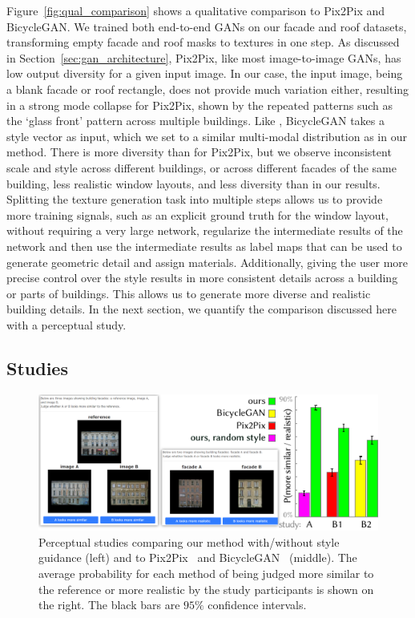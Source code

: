 Figure~\ref{fig:qual_comparison} shows a qualitative comparison to Pix2Pix and BicycleGAN. We trained both end-to-end GANs on our facade and roof datasets, transforming empty facade and roof masks to textures in one step. As discussed in Section~\ref{sec:gan_architecture}, Pix2Pix, like most image-to-image GANs, has low output diversity for a given input image. In our case, the input image, being a blank facade or roof rectangle, does not provide much variation either, resulting in a strong mode collapse for Pix2Pix, shown by the repeated patterns such as the `glass front' pattern across multiple buildings. Like \systemName, BicycleGAN takes a style vector as input, which we set to a similar multi-modal distribution as in our method. There is more diversity than for Pix2Pix, but we observe inconsistent scale and style across different buildings, or across different facades of the same building, less realistic window layouts, and less diversity than in our results. Splitting the texture generation task into multiple steps allows us to provide more training signals, such as an explicit ground truth for the window layout, without requiring a very large network, regularize the intermediate results of the network and then use the intermediate results as label maps that can be used to generate geometric detail and assign materials. Additionally, giving the user more precise control over the style results in more consistent details across a building or parts of buildings. This allows us to generate more diverse and realistic building details. In the next section, we quantify the comparison discussed here with a perceptual study.


\subsection{ Studies}

\begin{figure}[b]
    \centering
    \includegraphics[width=\columnwidth]{images/study.pdf}
    \caption{Perceptual studies comparing our method with/without style guidance (left) and to Pix2Pix~\cite{pix2pix} and BicycleGAN~\cite{zhu2017multimodal} (middle). The average probability for each method of being judged more similar to the reference or more realistic by the study participants is shown on the right. The black bars are $95\%$ confidence intervals.}
    \label{fig:study}
\end{figure}


